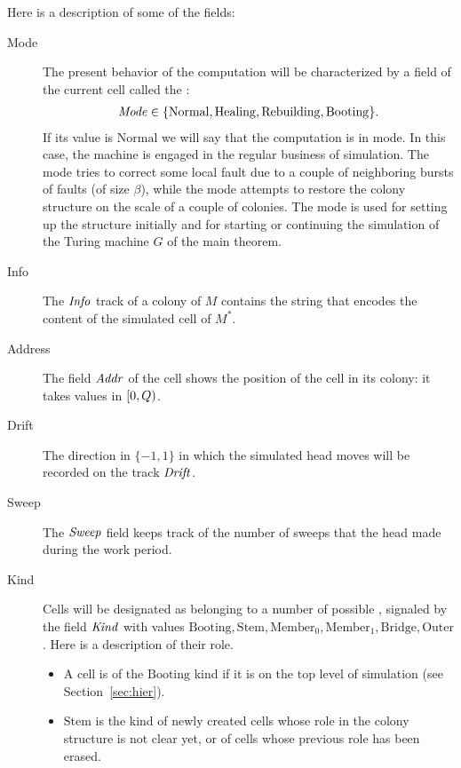 \documentclass[11pt]{memoir}
\theoremstyle{definition} %
\newcommand{\fld}[1]{\ensuremath{\textit{#1\/}}}
\def\G{G} %
\newcommand{\Q}{Q} %
\newcommand{\Addr}{\fld{Addr}}
\newcommand{\Drift}{\fld{Drift}}
\newcommand{\Info}{\fld{Info}}
\newcommand{\Kind}{\fld{Kind}}
\newcommand{\Mode}{\fld{Mode}}
\newcommand{\Sweep}{\fld{Sweep}} %
\newcommand{\Normal}{\mathrm{Normal}}
\newcommand{\Healing}{\mathrm{Healing}}
\newcommand{\Rebuilding}{\mathrm{Rebuilding}}
\newcommand{\Stem}{\mathrm{Stem}}
\newcommand{\Booting}{\mathrm{Booting}}
\newcommand{\Bridge}{\mathrm{Bridge}}
\newcommand{\Member}{\mathrm{Member}}
\newcommand{\Outer}{\mathrm{Outer}}
\begin{document}
Here is a description of some of the fields:
\begin{description}
\item[Mode] The present behavior of the computation will be characterized by
a field of the current cell called the :
 \begin{align*}
   \Mode\in\{ \Normal,\Healing, \Rebuilding,\Booting \}.
 \end{align*}
 If its value is \( \Normal \) we will say that the computation is in  mode.
 In this case, the machine is engaged in the regular business of simulation.
The  mode tries to correct some local fault due to a couple of neighboring
bursts of faults (of size \( \beta \)),
while the  mode attempts to restore the colony structure
on the scale of a couple of colonies.
The  mode is used for setting up the structure initially and for starting or continuing the
simulation of the Turing machine \( \G \) of the main theorem.

\item[Info] The  \( \Info \) track of a colony of \( M \)
  contains the string that encodes the content of the simulated cell of \( M^{*} \).

\item[Address] The field \( \Addr \)
of the cell shows the position of the cell in its colony:
it takes values in \( \lint{0}{\Q} \).

\item[Drift] The direction in \( \{-1,1\} \) in which the simulated head moves will be recorded on the track
 \( \Drift \).

\item[Sweep] The \( \Sweep \)
  field keeps track of the number of sweeps that the head made during the work period.

\item[Kind] Cells will be designated as belonging to a number of
  possible , signaled by the field \( \Kind \)
with values \(  \Booting, \Stem, \Member_{0},\Member_{1},\Bridge,\Outer \).
Here is a description of their role.
\begin{itemize}

\item A cell is of the \( \Booting \) kind if it is on the top level of simulation (see Section~\ref{sec:hier}).

\item \( \Stem \) is the kind of newly created cells
  whose role in the colony structure is not clear yet, or of cells whose previous
  role has been erased.


\end{itemize}
\end{description}
\end{document}
